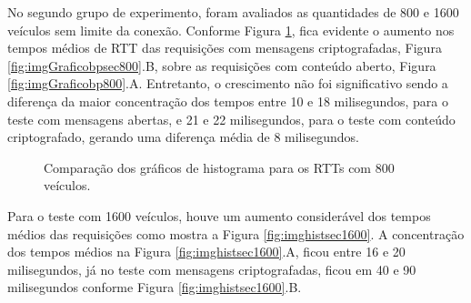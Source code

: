 \documentclass[
	12pt,				%
	oneside,			%
	a4paper,			%
	english,			%
	brazil				%
	]{abntex2ppgsi}
\begin{document}
No segundo grupo de experimento, foram avaliados as quantidades de 800 e 1600 veículos sem limite da conexão. Conforme Figura \ref{fig:imghistsec800}, fica evidente o aumento nos tempos médios de RTT das requisições com mensagens criptografadas, Figura \ref{fig:imgGraficobpsec800}.B, sobre as requisições com conteúdo aberto, Figura \ref{fig:imgGraficobp800}.A. Entretanto, o crescimento não foi significativo sendo a diferença da maior concentração dos tempos entre 10 e 18 milisegundos, para o teste com mensagens abertas, e 21 e 22 milisegundos, para o teste com conteúdo criptografado, gerando uma diferença média de 8 milisegundos.

\begin{figure}[h!]
	\caption{Comparação dos gráficos de histograma para os RTTs com 800 veículos.}
	\centering
	\label{fig:imghistsec800}
\end{figure}  

Para o teste com 1600 veículos, houve um aumento considerável dos tempos médios das requisições como mostra a Figura \ref{fig:imghistsec1600}. A concentração dos tempos médios na Figura \ref{fig:imghistsec1600}.A, ficou entre 16 e 20 milisegundos, já no teste com mensagens criptografadas, ficou em 40 e 90 milisegundos conforme Figura \ref{fig:imghistsec1600}.B.
\end{document}
